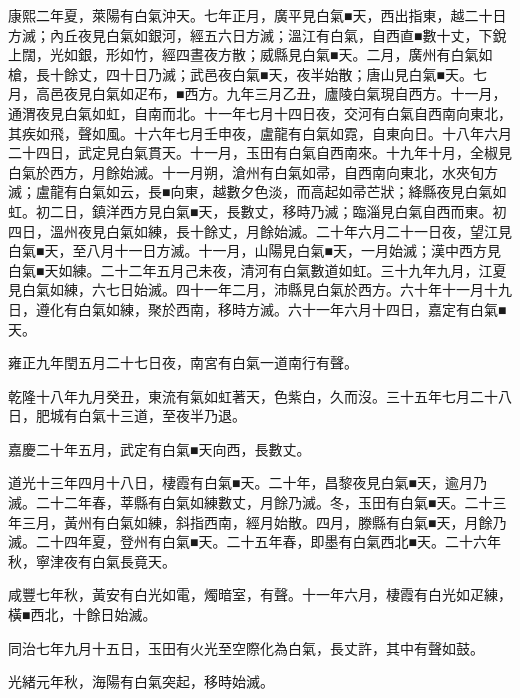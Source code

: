 \begin{pinyinscope}
康熙二年夏，萊陽有白氣沖天。七年正月，廣平見白氣■天，西出指東，越二十日方滅；內丘夜見白氣如銀河，經五六日方滅；溫江有白氣，自西直■數十丈，下銳上闊，光如銀，形如竹，經四晝夜方散；威縣見白氣■天。二月，廣州有白氣如槍，長十餘丈，四十日乃滅；武邑夜白氣■天，夜半始散；唐山見白氣■天。七月，高邑夜見白氣如疋布，■西方。九年三月乙丑，廬陵白氣現自西方。十一月，通渭夜見白氣如虹，自南而北。十一年七月十四日夜，交河有白氣自西南向東北，其疾如飛，聲如風。十六年七月壬申夜，盧龍有白氣如霓，自東向日。十八年六月二十四日，武定見白氣貫天。十一月，玉田有白氣自西南來。十九年十月，全椒見白氣於西方，月餘始滅。十一月朔，滄州有白氣如帚，自西南向東北，水夾旬方滅；盧龍有白氣如云，長■向東，越數夕色淡，而高起如帚芒狀；絳縣夜見白氣如虹。初二日，鎮洋西方見白氣■天，長數丈，移時乃滅；臨淄見白氣自西而東。初四日，溫州夜見白氣如練，長十餘丈，月餘始滅。二十年六月二十一日夜，望江見白氣■天，至八月十一日方滅。十一月，山陽見白氣■天，一月始滅；漢中西方見白氣■天如練。二十二年五月己未夜，清河有白氣數道如虹。三十九年九月，江夏見白氣如練，六七日始滅。四十一年二月，沛縣見白氣於西方。六十年十一月十九日，遵化有白氣如練，聚於西南，移時方滅。六十一年六月十四日，嘉定有白氣■天。

雍正九年閏五月二十七日夜，南宮有白氣一道南行有聲。

乾隆十八年九月癸丑，東流有氣如虹著天，色紫白，久而沒。三十五年七月二十八日，肥城有白氣十三道，至夜半乃退。

嘉慶二十年五月，武定有白氣■天向西，長數丈。

道光十三年四月十八日，棲霞有白氣■天。二十年，昌黎夜見白氣■天，逾月乃滅。二十二年春，莘縣有白氣如練數丈，月餘乃滅。冬，玉田有白氣■天。二十三年三月，黃州有白氣如練，斜指西南，經月始散。四月，滕縣有白氣■天，月餘乃滅。二十四年夏，登州有白氣■天。二十五年春，即墨有白氣西北■天。二十六年秋，寧津夜有白氣長竟天。

咸豐七年秋，黃安有白光如電，燭暗室，有聲。十一年六月，棲霞有白光如疋練，橫■西北，十餘日始滅。

同治七年九月十五日，玉田有火光至空際化為白氣，長丈許，其中有聲如鼓。

光緒元年秋，海陽有白氣突起，移時始滅。


\end{pinyinscope}